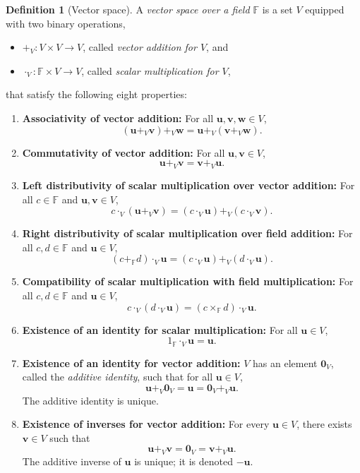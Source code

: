 \documentclass[11pt, a4paper, notitlepage]{report}
\theoremstyle{definition}
\newtheorem{definition}[theorem]{Definition}
\theoremstyle{remark}
\begin{document}
\begin{definition}[Vector space]\label{def:vector-space}
A \emph{vector space over a field $\mathbb{F}$} is a set $V$ equipped with two binary operations,
\begin{itemize}
  \item $+_V : V \times V \to V$, called \emph{vector addition for $V$}, and
  \item $\cdot_V : \mathbb{F} \times V \to V$, called \emph{scalar multiplication for $V$},
\end{itemize}
that satisfy the following eight properties:
\begin{enumerate}
  \item \textbf{Associativity of vector addition:} For all $\mathbf{u}, \mathbf{v}, \mathbf{w} \in V$,
    \[ (\mathbf{u} +_V \mathbf{v}) +_V \mathbf{w} = \mathbf{u} +_V (\mathbf{v} +_V \mathbf{w}). \]
  \item \textbf{Commutativity of vector addition:} For all $\mathbf{u}, \mathbf{v} \in V$,
    \[ \mathbf{u} +_V \mathbf{v} = \mathbf{v} +_V \mathbf{u}. \]
  \item \textbf{Left distributivity of scalar multiplication over vector addition:} For all $c \in \mathbb{F}$ and $\mathbf{u}, \mathbf{v} \in V$,
    \[ c \cdot_V (\mathbf{u} +_V \mathbf{v}) = (c \cdot_V \mathbf{u}) +_V (c \cdot_V \mathbf{v}). \]
  \item \textbf{Right distributivity of scalar multiplication over field addition:} For all $c, d \in \mathbb{F}$ and $\mathbf{u} \in V$,
    \[ (c +_\mathbb{F} d) \cdot_V \mathbf{u} = (c \cdot_V \mathbf{u}) +_V (d \cdot_V \mathbf{u}). \]
  \item \textbf{Compatibility of scalar multiplication with field multiplication:} For all $c, d \in \mathbb{F}$ and $\mathbf{u} \in V$,
    \[ c \cdot_V (d \cdot_V \mathbf{u}) = (c \times_\mathbb{F} d) \cdot_V \mathbf{u}. \]
  \item \textbf{Existence of an identity for scalar multiplication:} For all $\mathbf{u} \in V$,
    \[ 1_\mathbb{F} \cdot_V \mathbf{u} = \mathbf{u}. \]
  \item \textbf{Existence of an identity for vector addition:} $V$ has an element $\mathbf{0}_V$, called the \emph{additive identity}, such that for all $\mathbf{u} \in V$,
    \[ \mathbf{u} +_V \mathbf{0}_V = \mathbf{u} = \mathbf{0}_V +_V \mathbf{u}. \]
    The additive identity is unique.
  \item \textbf{Existence of inverses for vector addition:} For every $\mathbf{u} \in V$, there exists $\mathbf{v} \in V$ such that
    \[ \mathbf{u} +_V \mathbf{v} = \mathbf{0}_V = \mathbf{v} +_V \mathbf{u}. \]
    The additive inverse of $\mathbf{u}$ is unique; it is denoted $-\mathbf{u}$.
\end{enumerate}
\end{definition}
\end{document}
